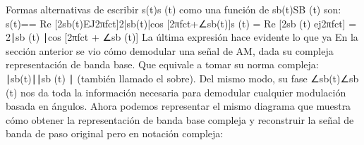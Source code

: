 Formas alternativas de escribir s(t)s (t) como una función de sb(t)SB (t) son: 
s(t)== Re [2sb(t)EJ2πfct]2|sb(t)|cos [2πfct+∠sb(t)]s (t) = Re [2sb (t) ej2πfct] = 2∣sb (t) ∣cos⁡ [2πfct + ∠sb (t)]
La última expresión hace evidente lo que ya En la sección anterior se vio cómo demodular una señal de AM, dada su compleja representación de banda base. Que equivale a tomar su norma compleja: ∣sb(t)∣∣sb (t) ∣ (también llamado el sobre). Del mismo modo, su fase ∠sb(t)∠sb (t) nos da toda la información necesaria para demodular cualquier modulación basada en ángulos.
Ahora podemos representar el mismo diagrama que muestra cómo obtener la representación de banda base compleja y reconstruir la señal de banda de paso original pero en notación compleja:
  

